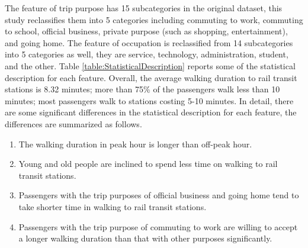 \documentclass[sustainability,article,submit,moreauthors,pdftex,10pt,a4paper]{Definitions/mdpi}
\begin{document}
The feature of trip purpose has 15 subcategories in the original dataset, this study reclassifies them into 5 categories including commuting to work, commuting to school, official business, private purpose (such as shopping, entertainment), and going home. The feature of occupation is reclassified from 14 subcategories into 5 categories as well, they are service, technology, administration, student, and the other. Table \ref{table:StatisticalDescription} reports some of the statistical description for each feature. Overall, the average walking duration to rail transit stations is 8.32 minutes; more than 75\% of the passengers walk less than 10 minutes; most passengers walk to stations costing 5-10 minutes. In detail, there are some significant differences in the statistical description for each feature, the differences are summarized as follows.
%
\begin{enumerate}
	\item The walking duration in peak hour is longer than off-peak hour.
	\item Young and old people are inclined to spend less time on walking to rail transit stations.
	\item Passengers with the trip purposes of official business and going home tend to take shorter time in walking to rail transit stations.
	\item Passengers with the trip purpose of commuting to work are willing to accept a longer walking duration than that with other purposes significantly.
\end{enumerate}
\end{document}
